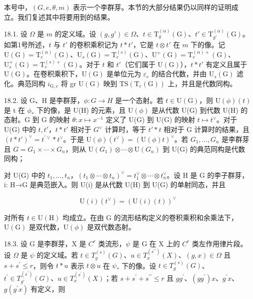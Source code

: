 本号中，\((G, e, \theta, m)\) 表示一个李群芽。本节的大部分结果仍以同样的证明成立。我们复述其中将要用到的结果。

18.1. 设 \(\Omega\) 是 \(m\) 的定义域。设 \((g, g') \in \Omega\)、\(t \in \mathrm{T}_g^{(\alpha)}(\mathrm{G})\)、\(t' \in \mathrm{T}_{g'}^{(\alpha)}(\mathrm{G})\)。如第1号所述，\(t\) 与 \(t'\) 的卷积乘积记为 \(t * t'\)，它是 \(t \otimes t'\) 在 \(m\) 下的像。记 \(\mathrm{U}(\mathrm{G}) = \mathrm{T}_e^{(\alpha)}(\mathrm{G})\)、\(\mathrm{U}_s(\mathrm{G}) = \mathrm{T}_e^{(s)}(\mathrm{G})\)、\(\mathrm{U}^+(\mathrm{G}) = \mathrm{T}_e^{(\alpha)+}(\mathrm{G})\)、\(\mathrm{U}_s^+(\mathrm{G}) = \mathrm{T}_e^{(s)+}(\mathrm{G})\)。对于 \(t\) 和 \(t'\)（它们属于 \(\mathrm{U}(\mathrm{G})\)），\(t * t'\) 有定义且属于 \(\mathrm{U}(\mathrm{G})\)。在卷积乘积下，\(\mathrm{U}(\mathrm{G})\) 是单位元为 \(\varepsilon_e\) 的结合代数，并由 \(\mathrm{U}_s(\mathrm{G})\) 滤化。典范同构 \(i_{\mathrm{G}, e}\) 将 gr \(\mathrm{U}(\mathrm{G})\) 映到 \(\mathrm{TS}(\mathrm{T}_e(\mathrm{G}))\) 上，并且是代数同构。

18.2. 设 G、H 是李群芽，\(\phi: G \to H\) 是一个态射。若 \(t \in \mathrm{U}(\mathrm{G})\)，则 \(\mathrm{U}(\phi)(t)\) 是 t 在 \(\phi_{*}\) 下的像，是 U(H) 的元素，且 \(\mathrm{U}(\phi)\) 是从代数 U(G) 到代数 U(H) 的态射。G 到 G 的映射 \(\theta: x \mapsto x^{-1}\) 定义了 U(G) 到 U(G) 的映射 \(t \mapsto t^{\vee}\)。对于 U(G) 中的 \(t, t'\)，\(t * t'\) 相对于 \(G^{\vee}\) 计算时，等于 \(t' * t\) 相对于 G 计算时的结果，且 \((t * t')^{\vee} = t^{\prime\vee} * t^\vee\)。于是 \(\mathrm{U}(\phi)(t^{\vee}) = (\mathrm{U}(\phi)t)^{\vee}\)。若 \(G_{1}, \ldots, G_{n}\) 是李群芽且 \(G = G_{1} \times \cdots \times G_{n}\)，则从 \(\mathrm{U}(G_{1}) \otimes \cdots \otimes \mathrm{U}(G_{n})\) 到 U(G) 的典范同构是代数同构；

对 U(G) 中的 \(t_{1},\ldots,t_{n}\)，\((t_{1}\otimes\cdots\otimes t_{n})^{\vee}=t_{1}^{\vee}\otimes\cdots\otimes t_{n}^{\vee}\)。设 H 是 G 的李子群芽，i: H→G 是典范嵌入。则 U(i) 是从代数 U(H) 到 U(G) 的单射同态，并且

\[
\mathrm{U} (i) \left(t ^ {\vee}\right) = \left(\mathrm{U} (i) (t)\right) ^ {\vee}
\]

对所有 \(t \in \mathrm{U}(\mathrm{H})\) 均成立。在由 G 的流形结构定义的卷积乘积和余乘法下，\(\mathrm{U}(\mathrm{G})\) 是双代数，\(\mathrm{U}(\phi)\) 是双代数态射。

18.3. 设 G 是李群芽，X 是 \(C^{r}\) 类流形，\(\psi\) 是 G 在 X 上的 \(C^{r}\) 类左作用律片段。设 \(\Omega\) 是 \(\psi\) 的定义域。若 \(t \in T_{g}^{(s)}(G)\)、\(u \in T_{x}^{(s^{\prime\prime})}(X)\)、\((g, x) \in \Omega\) 且 \(s + s^{\prime} \leqslant r\)，则令 \(t * u\) 表示 \(t \otimes u\) 在 \(\psi_{*}\) 下的像。设 \(t \in T_{g}^{(s)}(G)\)、\(t^{\prime} \in T_{g'}^{(s^{\prime})}(G)\)、\(u \in T_{x}^{(s^{\prime})}(X)\)；若 \(s + s^{\prime} + s^{\prime\prime} \leqslant r\) 且 \(gg^{\prime}\)、\((gg^{\prime})x\)、\(g^{\prime}x\)、\(g(g^{\prime}x)\) 有定义，则

